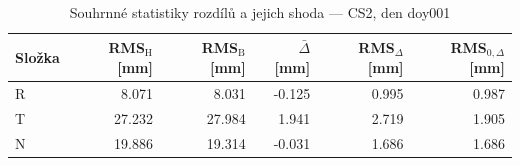 \begin{table}[H]
\centering
\caption{Souhrnné statistiky rozdílů a jejich shoda — CS2, den doy001}
\label{tab:hermite_vs_bernese_cs2_doy001_summary}
\begin{tabular}{lrrrrr}
\toprule
Složka & RMS$_\mathrm{H}$ [mm] & RMS$_\mathrm{B}$ [mm] & $\bar{\Delta}$ [mm] & RMS$_{\Delta}$ [mm] & RMS$_{0,\Delta}$ [mm] \\
\midrule
R & 8.071 & 8.031 & -0.125 & 0.995 & 0.987 \\
T & 27.232 & 27.984 & 1.941 & 2.719 & 1.905 \\
N & 19.886 & 19.314 & -0.031 & 1.686 & 1.686 \\
\bottomrule
\end{tabular}
\end{table}

